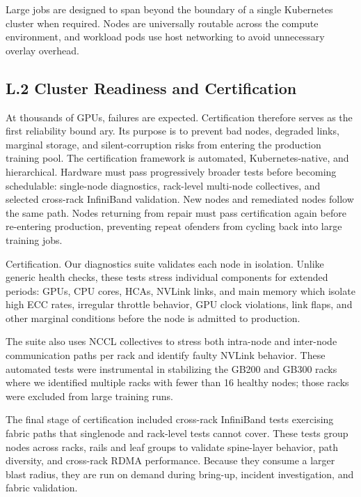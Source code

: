 \documentclass[
  10
]{article}
\begin{document}
Large jobs are designed to span beyond the boundary of a single
Kubernetes cluster when required. Nodes are universally routable across
the compute environment, and workload pods use host networking to avoid
unnecessary overlay overhead.

\subsection{L.2 Cluster Readiness and
Certification}\label{l.2-cluster-readiness-and-certification}

At thousands of GPUs, failures are expected. Certification therefore
serves as the first reliability bound ary. Its purpose is to prevent bad
nodes, degraded links, marginal storage, and silent-corruption risks
from entering the production training pool. The certification framework
is automated, Kubernetes-native, and hierarchical. Hardware must pass
progressively broader tests before becoming schedulable: single-node
diagnostics, rack-level multi-node collectives, and selected cross-rack
InfiniBand validation. New nodes and remediated nodes follow the same
path. Nodes returning from repair must pass certification again before
re-entering production, preventing repeat ofenders from cycling back
into large training jobs.

Certification. Our diagnostics suite validates each node in isolation.
Unlike generic health checks, these tests stress individual components
for extended periods: GPUs, CPU cores, HCAs, NVLink links, and main
memory which isolate high ECC rates, irregular throttle behavior, GPU
clock violations, link flaps, and other marginal conditions before the
node is admitted to production.

The suite also uses NCCL collectives to stress both intra-node and
inter-node communication paths per rack and identify faulty NVLink
behavior. These automated tests were instrumental in stabilizing the
GB200 and GB300 racks where we identified multiple racks with fewer than
16 healthy nodes; those racks were excluded from large training runs.

The final stage of certification included cross-rack InfiniBand tests
exercising fabric paths that singlenode and rack-level tests cannot
cover. These tests group nodes across racks, rails and leaf groups to
validate spine-layer behavior, path diversity, and cross-rack RDMA
performance. Because they consume a larger blast radius, they are run on
demand during bring-up, incident investigation, and fabric validation.
\end{document}
